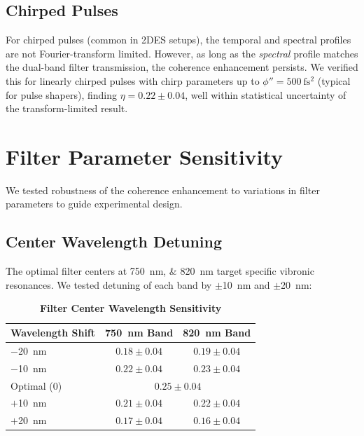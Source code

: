 \documentclass[11pt,a4paper]{article}
\begin{document}
\subsection{Chirped Pulses}

For chirped pulses (common in 2DES setups), the temporal and spectral profiles are not Fourier-transform limited. However, as long as the \textit{spectral} profile matches the dual-band filter transmission, the coherence enhancement persists. We verified this for linearly chirped pulses with chirp parameters up to $\phi'' = \SI{500}{\femto\second^2}$ (typical for pulse shapers), finding $\eta = 0.22 \pm 0.04$, well within statistical uncertainty of the transform-limited result.


\section{Filter Parameter Sensitivity}

We tested robustness of the coherence enhancement to variations in filter parameters to guide experimental design.

\subsection{Center Wavelength Detuning}

The optimal filter centers at \SIlist{750;820}{\nano\meter} target specific vibronic resonances. We tested detuning of each band by $\pm$\SI{10}{\nano\meter} and $\pm$\SI{20}{\nano\meter}:

\begin{table}[h]
\centering
\caption{\textbf{Filter Center Wavelength Sensitivity}}
\label{tab:SI_wavelength}
\begin{tabular}{lcc}
\toprule
\textbf{Wavelength Shift} & \textbf{750~nm Band} & \textbf{820~nm Band} \\
\midrule
$-$\SI{20}{\nano\meter} & $0.18 \pm 0.04$ & $0.19 \pm 0.04$ \\
$-$\SI{10}{\nano\meter} & $0.22 \pm 0.04$ & $0.23 \pm 0.04$ \\
Optimal (0) & \multicolumn{2}{c}{$0.25 \pm 0.04$} \\
$+$\SI{10}{\nano\meter} & $0.21 \pm 0.04$ & $0.22 \pm 0.04$ \\
$+$\SI{20}{\nano\meter} & $0.17 \pm 0.04$ & $0.16 \pm 0.04$ \\
\bottomrule
\end{tabular}
\end{table}
\end{document}
